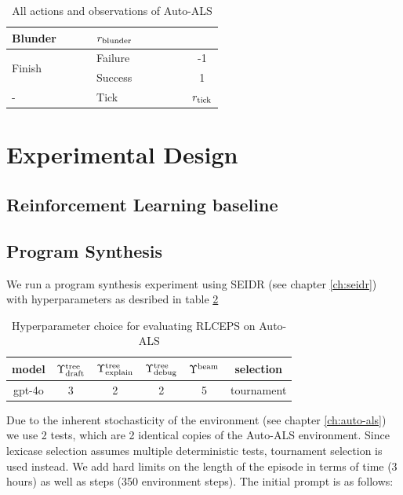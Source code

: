 \begin{table}[H]
\begin{tabular}{|p{0.4\linewidth}|p{0.45\linewidth}|c|}
   Blunder & $r_\text{blunder}$
   \\
   \midrule
   \multirow{2}{*}{Finish} & Failure & -1 \\
   & Success & 1 \\
   \midrule
   - & Tick & $r_\text{tick}$ \\
  \bottomrule
\end{tabular}
\caption{All actions and observations of Auto-ALS}
\label{tab:auto-als}
\end{table}

\section{Experimental Design}
\subsection{Reinforcement Learning baseline}

\newpage
\subsection{Program Synthesis}

We run a program synthesis experiment using SEIDR (see chapter \ref{ch:seidr}) with hyperparameters as desribed in table \ref{tab:rlceps-auto-als}

\begin{table}
    \centering
    \begin{tabular}{|c|c|c|c|c|c|}
        model & $\Upsilon^\text{tree}_\text{draft}$ & $\Upsilon^\text{tree}_\text{explain}$ & $\Upsilon^\text{tree}_\text{debug}$ & $\Upsilon^\text{beam}$ & selection \\
        \midrule
        gpt-4o & 3 & 2 & 2 & 5 & tournament
    \end{tabular}
    \caption{Hyperparameter choice for evaluating RLCEPS on Auto-ALS}
    \label{tab:rlceps-auto-als}
\end{table}

Due to the inherent stochasticity of the environment (see chapter \ref{ch:auto-als}) we use 2 tests, which are 2 identical copies of the Auto-ALS environment.
Since lexicase selection assumes multiple deterministic tests, tournament selection is used instead.
We add hard limits on the length of the episode in terms of time (3 hours) as well as steps (350 environment steps).
The initial prompt is as follows:



\newpage
